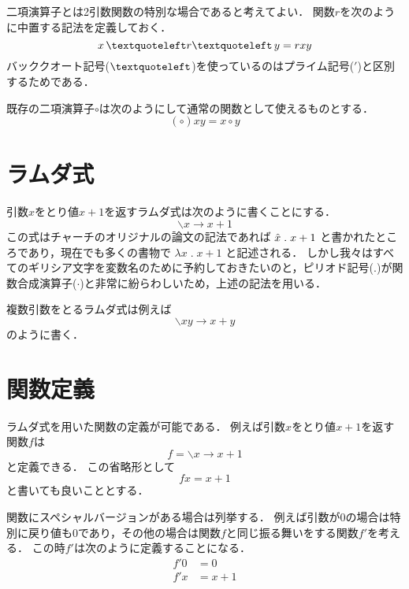 \documentclass[twocolumn]{jsbook}
\newcommand{\lambdaperiod}{\;.\;}
\begin{document}
二項演算子とは2引数関数の特別な場合であると考えてよい．
関数$r$を次のように中置する記法を定義しておく．
\begin{equation}
x\,\textquoteleft r\textquoteleft\,y=rxy
\end{equation}
バッククオート記号($\textquoteleft$)を使っているのはプライム記号($'$)と区別するためである．

既存の二項演算子$\circ$は次のようにして通常の関数として使えるものとする．
\begin{equation}
(\circ)xy=x\circ y
\end{equation}

\section{ラムダ式}

引数$x$をとり値$x+1$を返すラムダ式は次のように書くことにする．
\begin{equation}
\backslash x\rightarrow x+1
\end{equation}
この式はチャーチのオリジナルの論文の記法であれば $\Hat x\lambdaperiod x+1$ と書かれたところであり，現在でも多くの書物で $\lambda x\lambdaperiod x+1$ と記述される．
しかし我々はすべてのギリシア文字を変数名のために予約しておきたいのと，ピリオド記号($.$)が関数合成演算子($\cdot$)と非常に紛らわしいため，上述の記法を用いる．

複数引数をとるラムダ式は例えば $$\backslash xy\rightarrow x+y$$ のように書く．

\section{関数定義}

ラムダ式を用いた関数の定義が可能である．
例えば引数$x$をとり値$x+1$を返す関数$f$は
\begin{equation}
f=\backslash x\rightarrow x+1
\end{equation}
と定義できる．
この省略形として
\begin{equation}
fx=x+1
\end{equation}
と書いても良いこととする．

関数にスペシャルバージョンがある場合は列挙する．
例えば引数が$0$の場合は特別に戻り値も0であり，その他の場合は関数$f$と同じ振る舞いをする関数$f'$を考える．
この時$f'$は次のように定義することになる．
\begin{equation}
\begin{split}
f'0&=0\\
f'x&=x+1
\end{split}
\end{equation}
\end{document}
